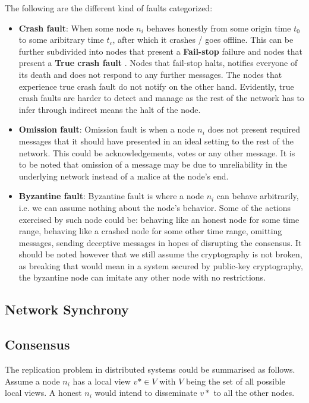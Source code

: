 The following are the different kind of faults categorized:
\begin{itemize}
    \item \textbf{Crash fault}:  When some node $n_i$ behaves honestly from some origin time $t_0$ to some aribitrary time $t_c$, after which it crashes / goes offline. This can be further subdivided into nodes that present a \textbf{Fail-stop}  failure and nodes that present a \textbf{True crash fault} . Nodes that fail-stop halts, notifies everyone of its death and does not respond to any further messages. The nodes that experience true crash fault do not notify on the other hand. Evidently, true crash faults are harder to detect and manage as the rest of the network has to infer through indirect means the halt of the node.
    \item \textbf{Omission fault}:  Omission fault is when a node $n_i$ does not present required messages that it should have presented in an ideal setting to the rest of the network. This could be acknowledgements, votes or any other message. It is to be noted that omission of a message may be due to unreliability in the underlying network instead of a malice at the node's end.
    \item \textbf{Byzantine fault}:  Byzantine fault is where a node $n_i$ can behave arbitrarily, i.e. we can assume nothing about the node's behavior. Some of the actions exercised by such node could be: behaving like an honest node for some time range, behaving like a crashed node for some other time range, omitting messages, sending deceptive messages in hopes of disrupting the consensus. It should be noted however that we still assume the cryptography is not broken, as breaking that would mean in a system secured by public-key cryptography, the byzantine node can imitate any other node with no restrictions.
\end{itemize}

\subsection{Network Synchrony}

\subsection{Consensus}
The replication problem in distributed systems could be summarised as follows. Assume a node $n_i$ has a local view $v* \in V$ with $V$ being the set of all possible local views. A honest $n_i$ would intend to disseminate $v*$ to all the other nodes. 

